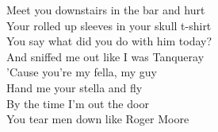 Meet you downstairs in the bar and hurt \\
Your rolled up sleeves in your skull t-shirt \\
You say what did you do with him today? \\
And sniffed me out like I was Tanqueray \\

'Cause you're my fella, my guy \\
Hand me your stella and fly \\
By the time I'm out the door \\
You tear men down like Roger Moore \\
